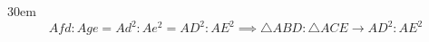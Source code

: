 \documentclass[border=4pt]{standalone}
\begin{document}
\begin{varwidth}{30em}
\large
\[ Afd:Age = Ad^2:Ae^2 = AD^2:AE^2 \implies \triangle ABD:\triangle ACE \to AD^2:AE^2 \]

\end{varwidth}
\end{document}
